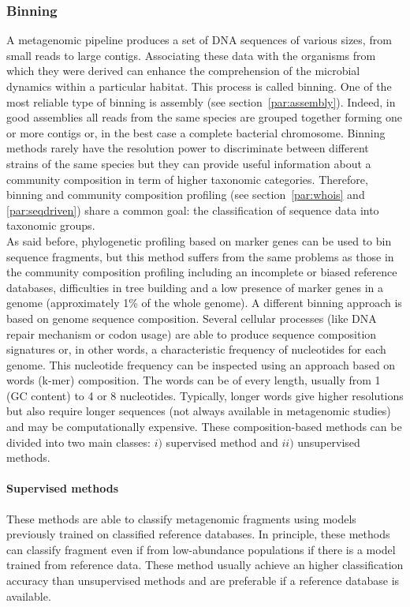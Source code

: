 \subsubsection{Binning}
A metagenomic pipeline produces a set of DNA sequences of various sizes, from small reads to large contigs. Associating these data with the organisms from which they were derived can enhance the comprehension of the microbial dynamics within a particular habitat. This process is called binning. One of the most reliable type of binning is assembly (see section~\ref{par:assembly}). Indeed, in good assemblies all reads from the same species are grouped together forming one or more contigs or, in the best case a complete bacterial chromosome. Binning methods rarely have the resolution power to discriminate between different strains of the same species but they can provide useful information about a community composition in term of higher taxonomic categories. Therefore, binning and community composition profiling (see section~\ref{par:whois} and \ref{par:seqdriven}) share a common goal: the classification of sequence data into taxonomic groups.\\
As said before, phylogenetic profiling based on marker genes can be used to bin sequence fragments, but this method suffers from the same problems as those in the community composition profiling including an incomplete or biased reference databases, difficulties in tree building and a low presence of marker genes in a genome (approximately 1\% of the whole genome). A different binning approach is based on genome sequence composition. Several cellular processes (like DNA repair mechanism or codon usage) are able to produce sequence composition signatures or, in other words, a characteristic frequency of nucleotides for each genome. This nucleotide frequency can be inspected using an approach based on words (k-mer) composition. The words can be of every length, usually from 1 (GC content) to 4 or 8 nucleotides. Typically, longer words give higher resolutions but also require longer sequences (not always available in metagenomic studies) and may be computationally expensive. These composition-based methods can be divided into two main classes: $i)$ supervised method and $ii)$ unsupervised methods.\\%

\paragraph{Supervised methods}
These methods are able to classify metagenomic fragments using models previously trained on classified reference databases. In principle, these methods can classify fragment even if from low-abundance populations if there is a model trained from reference data. These method usually achieve an higher classification accuracy than unsupervised methods and are preferable if a reference database is available.\\%

